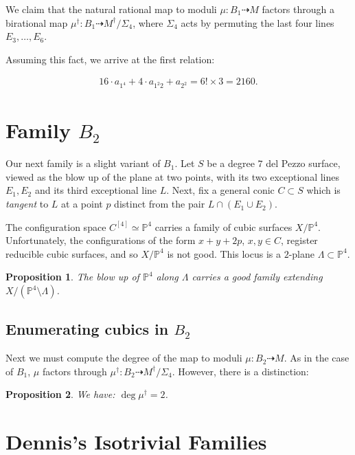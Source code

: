 \documentclass{article}
\newtheorem{proposition}{Proposition}[section]
\renewcommand{\P}{\mathbb{P}}
\newcommand{\<}{\left\langle}
\renewcommand{\>}{\right\rangle}
\begin{document}
  We claim that the natural rational map to moduli
  $\mu : B_1 \dashrightarrow M$ factors through a birational map
  $\mu^{\dagger}: B_1 \dashrightarrow M^{\dagger}/\Sigma_{4}$, where
  $\Sigma_{4}$ acts by permuting the last four lines
  $E_{3}, \dots, E_{6}$.

Assuming this fact, we arrive at the first relation:

\begin{align}
  \label{eq:relation1}
  16 \cdot a_{1^4} + 4 \cdot a_{1^2 2} + a_{2^2} = 6! \times 3 = 2160.
\end{align}

\section{Family $B_2$}
\label{sec:family-b_2}

Our next family is a slight variant of $B_1$. Let $S$ be a degree $7$
del Pezzo surface, viewed as the blow up of the plane at two points,
with its two exceptional lines $E_1, E_2$ and its third exceptional
line $L$.  Next, fix a general conic $C \subset S$ which is {\sl
  tangent} to $L$ at a point $p$ distinct from the pair
$L \cap (E_1 \cup E_2)$.

The configuration space $C^{[4]} \simeq \P^{4}$ carries a family of
cubic surfaces $X/\P^{4}$.  Unfortunately, the configurations of the
form $x+y+2p$, $x,y \in C$, register reducible cubic surfaces, and so
$X/\P^{4}$ is not good.  This locus is a $2$-plane
$\Lambda \subset \P^{4}$.

\begin{proposition}
  \label{proposition:resolveB2} The blow up of $\P^{4}$ along
  $\Lambda$ carries a good family extending
  $X/(\P^{4} \setminus \Lambda)$.
\end{proposition}

\subsection{Enumerating cubics in $B_2$}
\label{sec:enum-cubics-b_2}

Next we must compute the degree of the map to moduli
$\mu: B_2 \dashrightarrow M$. As in the case of $B_1$, $\mu$ factors
through $\mu^{\dagger}: B_2 \dashrightarrow M^\dagger/\Sigma_{4}$.
However,  there is a distinction:

\begin{proposition}
  \label{proposition:deg-mudagger2}
  We have: $\deg \mu^{\dagger} = 2$.
\end{proposition}


\section{Dennis's Isotrivial Families}
\label{sec:denn-isotr-famil}




%
%
\end{document}
